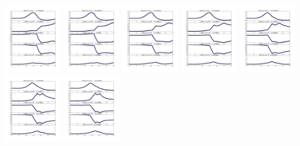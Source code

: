 \documentclass[11pt]{article}
\begin{document}
\vskip 10pt 
\includegraphics[width=0.19\textwidth]{frame0020fig1.png}
\vskip 10pt 
\includegraphics[width=0.19\textwidth]{frame0021fig1.png}
\vskip 10pt 
\includegraphics[width=0.19\textwidth]{frame0022fig1.png}
\vskip 10pt 
\includegraphics[width=0.19\textwidth]{frame0023fig1.png}
\vskip 10pt 
\includegraphics[width=0.19\textwidth]{frame0024fig1.png}
\vskip 10pt 
\includegraphics[width=0.19\textwidth]{frame0025fig1.png}
\vskip 10pt 
\includegraphics[width=0.19\textwidth]{frame0026fig1.png}
\end{document}
